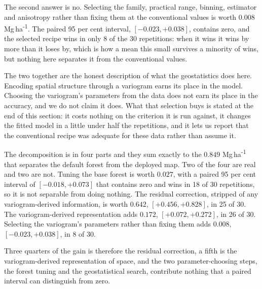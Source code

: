 \documentclass[preprint,12pt,authoryear]{elsarticle}
\newcommand{\Mgha}{Mg\,ha\textsuperscript{-1}}
\begin{document}
The second answer is no. Selecting the family, practical range, binning,
estimator and anisotropy rather than fixing them at the conventional values is
worth $0.008$ \Mgha{}. The paired 95 per cent interval, $[-0.023, +0.038]$,
contains zero, and the selected recipe wins in only 8 of the 30 repetitions:
when it wins it wins by more than it loses by, which is how a mean this small
survives a minority of wins, but nothing here separates it from the conventional
values.

The two together are the honest description of what the geostatistics does
here. Encoding spatial structure through a variogram earns its place in the
model. Choosing the variogram's parameters from the data does not earn its
place in the accuracy, and we do not claim it does. What that selection buys is
stated at the end of this section: it costs nothing on the criterion it is
run against, it changes the fitted model in a little under half the
repetitions, and it lets us report that the conventional recipe was adequate
for these data rather than assume it.

\begin{table}[!ht]
\centering
\caption{Decomposition of the improvement under the simple random design, 30
repetitions, $n=500$, RMSE in \Mgha{}. The third row removes the
variogram-derived features from the residual learner while keeping the plain
coordinates, isolating what the variogram representation contributes. The
fourth selects the variogram family, practical range, binning, estimator and
anisotropy out of fold. Wins count repetitions in which that configuration
beats the uncorrected forest.}
\label{tab:ablation}
\small

\end{table}

The decomposition is in four parts and they sum exactly to the $0.849$ \Mgha{}
that separates the default forest from the deployed map. Two of the four are
real and two are not. Tuning the base forest is worth $0.027$, with a paired 95
per cent interval of $[-0.018, +0.073]$ that contains zero and wins in 18 of 30
repetitions, so it is not separable from doing nothing. The residual correction,
stripped of any variogram-derived information, is worth $0.642$,
$[+0.456, +0.828]$, in 25 of 30. The variogram-derived representation adds
$0.172$, $[+0.072, +0.272]$, in 26 of 30. Selecting the variogram's parameters
rather than fixing them adds $0.008$, $[-0.023, +0.038]$, in 8 of 30.

Three quarters of the gain is therefore the residual correction, a fifth is the
variogram-derived representation of space, and the two parameter-choosing steps,
the forest tuning and the geostatistical search, contribute nothing that a
paired interval can distinguish from zero.
\end{document}
